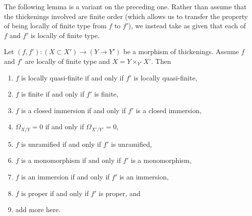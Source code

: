 \noindent
The following lemma is a variant on the preceding one. Rather than assume
that the thickenings involved are finite order (which allows us to transfer
the property of being locally of finite type from $f$ to $f'$),
we instead take as given that each of $f$ and $f'$ is locally of
finite type.

\begin{lemma}
\label{lemma-properties-that-extend-over-thickenings}
Let $(f, f') : (X \subset X') \to (Y \to Y')$ be a morphism
of thickenings. Assume $f$ and $f'$ are locally of finite type
and $X = Y \times_{Y'} X'$. Then
\begin{enumerate}
\item $f$ is locally quasi-finite if and only if $f'$ is locally quasi-finite,
\item $f$ is finite if and only if $f'$ is finite,
\item $f$ is a closed immersion if and only if $f'$ is a closed immersion,
\item $\Omega_{X/Y} = 0$ if and only if $\Omega_{X'/Y'} = 0$,
\item $f$ is unramified if and only if $f'$ is unramified,
\item $f$ is a monomorphism if and only if $f'$ is a monomorphism,
\item $f$ is an immersion if and only if $f'$ is an immersion,
\item $f$ is proper if and only if $f'$ is proper, and
\item add more here.
\end{enumerate}
\end{lemma}


